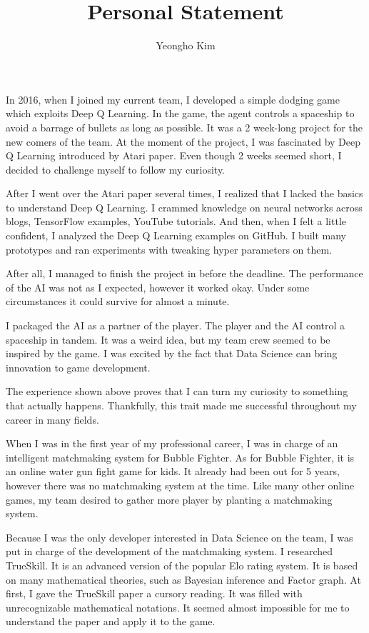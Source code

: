 \documentclass[11pt]{article}
\author{Yeongho Kim}
\date{}
\title{Personal Statement}
\begin{document}
\maketitle
\vspace{-4ex}

In 2016, when I joined my current team, I developed a simple dodging game which exploits Deep Q Learning.
In the game, the agent controls a spaceship to avoid a barrage of bullets as long as possible.
It was a 2 week-long project for the new comers of the team.
At the moment of the project, I was fascinated by Deep Q Learning introduced by Atari paper.
Even though 2 weeks seemed short, I decided to challenge myself to follow my curiosity.

After I went over the Atari paper several times, I realized that I lacked the basics to understand Deep Q Learning.
I crammed knowledge on neural networks across blogs, TensorFlow examples, YouTube tutorials.
And then, when I felt a little confident, I analyzed the Deep Q Learning examples on GitHub.
I built many prototypes and ran experiments with tweaking hyper parameters on them.

After all, I managed to finish the project in before the deadline.
The performance of the AI was not as I expected, however it worked okay.
Under some circumstances it could survive for almost a minute.

I packaged the AI as a partner of the player.
The player and the AI control a spaceship in tandem.
It was a weird idea, but my team crew seemed to be inspired by the game.
I was excited by the fact that Data Science can bring innovation to game development.

The experience shown above proves that I can turn my curiosity to something that actually happens.
Thankfully, this trait made me successful throughout my career in many fields. 

When I was in the first year of my professional career, I was in charge of an intelligent matchmaking system for Bubble Fighter.
As for Bubble Fighter, it is an online water gun fight game for kids.
It already had been out for 5 years, however there was no matchmaking system at the time.
Like many other online games, my team desired to gather more player by planting a matchmaking system.

Because I was the only developer interested in Data Science on the team, I was put in charge of the development of the matchmaking system.
I researched TrueSkill. It is an advanced version of the popular Elo rating system.
It is based on many mathematical theories, such as Bayesian inference and Factor graph.
At first, I gave the TrueSkill paper a cursory reading.
It was filled with unrecognizable mathematical notations.
It seemed almost impossible for me to understand the paper and apply it to the game.
\end{document}
